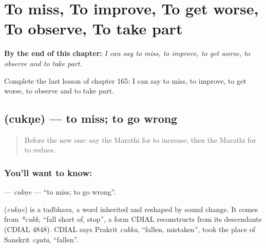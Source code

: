 
\chapter{To miss, To improve, To get worse, To observe, To take part}
\label{ch:mr-to-miss-to-improve-to-get-worse-to-observe-to-take-part}

\begin{chapteropening}
\textbf{By the end of this chapter:} \emph{I can say to miss, to improve, to get worse, to observe and to take part.}

Complete the last lesson of chapter 165: I can say to miss, to improve, to get worse, to observe and to take part.
\end{chapteropening}

\section[\texorpdfstring{\mr{चुकणे} (cukṇe)}{चुकणे (cukṇe)}]{ (cukṇe) — to miss; to go wrong}

\label{lesson:MR-C165-cukne}



\begin{quote}
Before the new one: say the Marathi for to increase, then the Marathi for to reduce.
\end{quote}

\subsection*{You'll want to know: }
\textbf{} — \emph{cukṇe} — \textquotedblleft{}to miss; to go wrong\textquotedblright{}.

\begin{cousinweb}
\textbf{} (\emph{cukṇe}) is a tadbhava, a word inherited and reshaped by sound change. It comes from \emph{*cukk}, \textquotedblleft{}fall short of, stop\textquotedblright{}, a form CDIAL reconstructs from its descendants (CDIAL 4848). CDIAL says Prakrit \emph{cukka}, \textquotedblleft{}fallen, mistaken\textquotedblright{}, took the place of Sanskrit \emph{cyuta}, \textquotedblleft{}fallen\textquotedblright{}.
\end{cousinweb}

